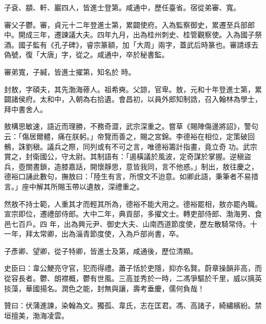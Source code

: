 \begin{pinyinscope}
 子袞、顓、軒、巖四人，皆進士登第。咸通中，歷任臺省。宿從弟審、寬。



 審父子鬱。審，貞元十二年登進士第，累闢使府。入為監察御史，累遷至兵部郎中。開成三年，遷諫議大夫。四年九月，出為桂州刺史、桂管觀察使。入為國子祭酒。國子監有《孔子碑》，睿宗篆額，加「大周」兩字，蓋武后時篆也。審請琢去偽號，復「大唐」字，從之。咸通中，卒於秘書監。



 審弟寬，子緘，皆進士擢第，知名於
 時。



 封敖，字碩夫，其先渤海蓚人。祖希奭。父諒，官卑。敖，元和十年登進士第，累闢諸侯府。太和中，入朝為右拾遺。會昌初，以員外郎知制誥，召入翰林為學士，拜中書舍人。



 敖構思敏速，語近而理勝，不務奇澀，武宗深重之。嘗草《賜陣傷邊將詔》，警句云：「傷居爾體，痛在朕躬。」帝覽而善之，賜之宮錦。李德裕在相位，定策破回鶻，誅劉稹。議兵之際，同列或有不可之言，唯德裕籌計指畫，竟立奇
 功。武宗賞之，封衛國公，守太尉。其制語有：「遏橫議於風波，定奇謀於掌握。逆稹盜兵，壺關晝鎖，造膝嘉話，開懷靜思，意皆我同，言不他惑。」制出，敖往慶之，德裕口誦此數句，撫敖曰：「陸生有言，所恨文不迨意。如卿此語，秉筆者不易措言。」座中解其所賜玉帶以遺敖，深禮重之。



 然敖不持士範，人重其才而輕其所為，德裕不能大用之。德裕罷相，敖亦罷內職。宣宗即位，遷禮部侍郎。大中二年，典貢部，多擢文士。轉吏部侍郎、渤海男、食邑七百戶。四
 年，出為興元尹、御史大夫、山南西道節度使，歷左散騎常侍。十一年，拜太常卿，出為淄青節度使，入為戶部尚書，卒。



 子彥卿、望卿，從子特卿，皆進士及第，咸通後，歷位清顯。



 史臣曰：韋公鯁亮守官，犯而得禮。蕭子恬於吏隱，抑亦名賢。蔚章操韻非高，而從容長者。鬱、朗襟概，鬱有世風。三高並秀於一時，二馮爭驅於千里，威以摛英掞藻，華國揚名。潤色之能，封無與讓，壽考垂慶，儒何負哉！



 贊曰：伏蒲進諫，染翰為文。獨孤、韋氏，志在匡君。馮、高諸子，綺繡繽紛。禁垣擅美，渤海凌雲。



\end{pinyinscope}